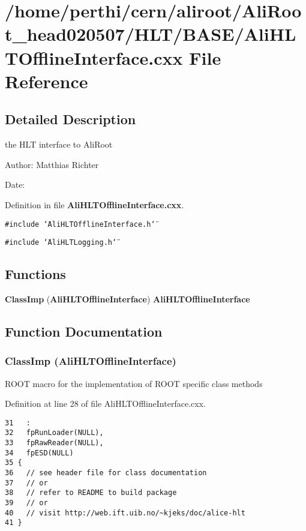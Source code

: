 \section{/home/perthi/cern/aliroot/Ali\-Root\_\-head020507/HLT/BASE/Ali\-HLTOffline\-Interface.cxx File Reference}
\label{AliHLTOfflineInterface_8cxx}


\subsection{Detailed Description}
the HLT interface to Ali\-Root 

\begin{Desc}
\item[Author:]Matthias Richter \end{Desc}
\begin{Desc}
\item[Date:]\end{Desc}


Definition in file {\bf Ali\-HLTOffline\-Interface.cxx}.

{\tt \#include \char`\"{}Ali\-HLTOffline\-Interface.h\char`\"{}}\par
{\tt \#include \char`\"{}Ali\-HLTLogging.h\char`\"{}}\par
\subsection*{Functions}
\begin{CompactItemize}
\item 
{\bf Class\-Imp} ({\bf Ali\-HLTOffline\-Interface}) {\bf Ali\-HLTOffline\-Interface}
\end{CompactItemize}


\subsection{Function Documentation}
\subsubsection{\setlength{\rightskip}{0pt plus 5cm}Class\-Imp ({\bf Ali\-HLTOffline\-Interface})}\label{AliHLTOfflineInterface_8cxx_a0}


ROOT macro for the implementation of ROOT specific class methods 

Definition at line 28 of file Ali\-HLTOffline\-Interface.cxx.

\footnotesize\begin{verbatim}31   :
32   fpRunLoader(NULL),
33   fpRawReader(NULL),
34   fpESD(NULL)
35 {
36   // see header file for class documentation
37   // or
38   // refer to README to build package
39   // or
40   // visit http://web.ift.uib.no/~kjeks/doc/alice-hlt
41 }

\end{verbatim}\normalsize 


